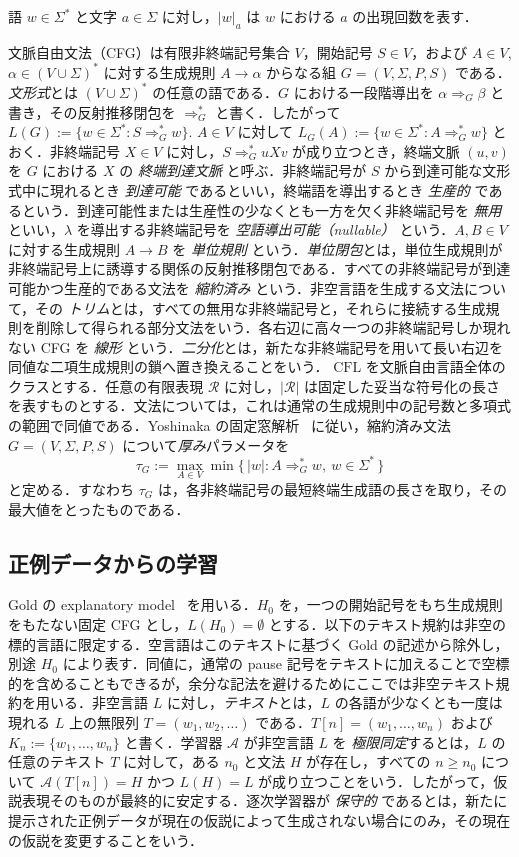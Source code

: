 \documentclass[11pt,a4paper]{ltjsarticle}
\theoremstyle{remark}
\theoremstyle{plain}
\begin{document}
語 $w\in\Sigma^*$ と文字 $a\in\Sigma$ に対し，$|w|_a$ は $w$ における $a$ の出現回数を表す．

文脈自由文法（CFG）は有限非終端記号集合 $V$，開始記号 $S\in V$，および $A\in V$, $\alpha\in(V\cup\Sigma)^*$ に対する生成規則 $A\to\alpha$ からなる組 $G=(V,\Sigma,P,S)$ である．\emph{文形式}とは $(V\cup\Sigma)^*$ の任意の語である．$G$ における一段階導出を $\alpha\Rightarrow_G\beta$ と書き，その反射推移閉包を $\Rightarrow_G^*$ と書く．したがって
$L(G):=\{w\in\Sigma^*:S\Rightarrow_G^*w\}$.
$A\in V$ に対して
$L_G(A):=\{w\in\Sigma^*:A\Rightarrow_G^*w\}$
とおく．非終端記号 $X\in V$ に対し，$S\Rightarrow_G^*uXv$ が成り立つとき，終端文脈 $(u,v)$ を $G$ における $X$ の \emph{終端到達文脈} と呼ぶ．非終端記号が $S$ から到達可能な文形式中に現れるとき \emph{到達可能} であるといい，終端語を導出するとき \emph{生産的} であるという．到達可能性または生産性の少なくとも一方を欠く非終端記号を \emph{無用} といい，$\lambda$ を導出する非終端記号を \emph{空語導出可能（nullable）} という．$A,B\in V$ に対する生成規則 $A\to B$ を \emph{単位規則} という．\emph{単位閉包}とは，単位生成規則が非終端記号上に誘導する関係の反射推移閉包である．すべての非終端記号が到達可能かつ生産的である文法を \emph{縮約済み} という．非空言語を生成する文法について，その \emph{トリム}とは，すべての無用な非終端記号と，それらに接続する生成規則を削除して得られる部分文法をいう．各右辺に高々一つの非終端記号しか現れない CFG を \emph{線形} という．\emph{二分化}とは，新たな非終端記号を用いて長い右辺を同値な二項生成規則の鎖へ置き換えることをいう．
$\mathrm{CFL}$ を文脈自由言語全体のクラスとする．任意の有限表現 $\mathcal R$ に対し，$|\mathcal R|$ は固定した妥当な符号化の長さを表すものとする．文法については，これは通常の生成規則中の記号数と多項式の範囲で同値である．Yoshinaka の固定窓解析~\cite{yoshinaka2008} に従い，縮約済み文法 $G=(V,\Sigma,P,S)$ について\emph{厚み}パラメータを
\[
 \tau_G:=\max_{A\in V}\min\{\,|w|:A\Rightarrow_G^*w,\ w\in\Sigma^*\,\}
\]
と定める．すなわち $\tau_G$ は，各非終端記号の最短終端生成語の長さを取り，その最大値をとったものである．

\subsection{正例データからの学習}\label{sec:learning}

Gold の explanatory model~\cite{gold1967} を用いる．$H_0$ を，一つの開始記号をもち生成規則をもたない固定 CFG とし，$L(H_0)=\emptyset$ とする．以下のテキスト規約は非空の標的言語に限定する．空言語はこのテキストに基づく Gold の記述から除外し，別途 $H_0$ により表す．同値に，通常の pause 記号をテキストに加えることで空標的を含めることもできるが，余分な記法を避けるためにここでは非空テキスト規約を用いる．非空言語 $L$ に対し，\emph{テキスト}とは，$L$ の各語が少なくとも一度は現れる $L$ 上の無限列 $T=(w_1,w_2,\ldots)$ である．$T[n]=(w_1,\ldots,w_n)$ および $K_n:=\{w_1,\ldots,w_n\}$ と書く．学習器 $\mathcal A$ が非空言語 $L$ を \emph{極限同定}するとは，$L$ の任意のテキスト $T$ に対して，ある $n_0$ と文法 $H$ が存在し，すべての $n\ge n_0$ について $\mathcal A(T[n])=H$ かつ $L(H)=L$ が成り立つことをいう．したがって，仮説表現そのものが最終的に安定する．逐次学習器が \emph{保守的} であるとは，新たに提示された正例データが現在の仮説によって生成されない場合にのみ，その現在の仮説を変更することをいう．
\end{document}
